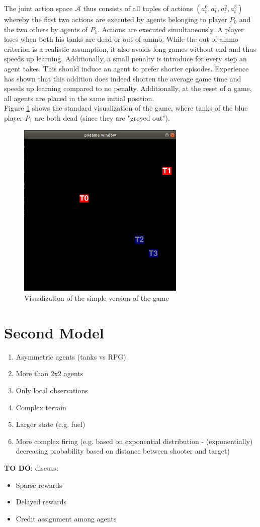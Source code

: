 The joint action space $\mathcal{A}$ thus consists of all tuples of actions $(a_t^0, a_t^1, a_t^2, a_t^3)$ whereby the first two actions are executed by agents belonging to player $P_0$ and the two others by agents of $P_1$. Actions are executed simultaneously. A player loses when both his tanks are dead or out of ammo. While the out-of-ammo criterion is a realistic assumption, it also avoids long games without end and thus speeds up learning. Additionally, a small penalty is introduce for every step an agent takes. This should induce an agent to prefer shorter episodes. Experience has shown that this addition does indeed shorten the average game time and speeds up learning compared to no penalty. Additionally, at the reset of a game, all agents are placed in the same initial position.\\
Figure \ref{fig:game_visual} shows the standard visualization of the game, where tanks of the blue player $P_1$ are both dead (since they are "greyed out").

\begin{figure}[htp]
    \centering
    \includegraphics[width=8cm]{images/game_visual.png}
    \caption{Visualization of the simple version of the game}
    \label{fig:game_visual}
\end{figure}



\section{Second Model}
\begin{enumerate}
    \item Asymmetric agents (tanks vs RPG)
    \item More than 2x2 agents
    \item Only local observations
    \item Complex terrain
    \item Larger state (e.g. fuel)
    \item More complex firing (e.g. based on exponential distribution - (exponentially) decreasing probability based on distance between shooter and target)
\end{enumerate}

\textbf{TO DO}: discuss:
\begin{itemize}
    \item Sparse rewards
    \item Delayed rewards
    \item Credit assignment among agents
\end{itemize}